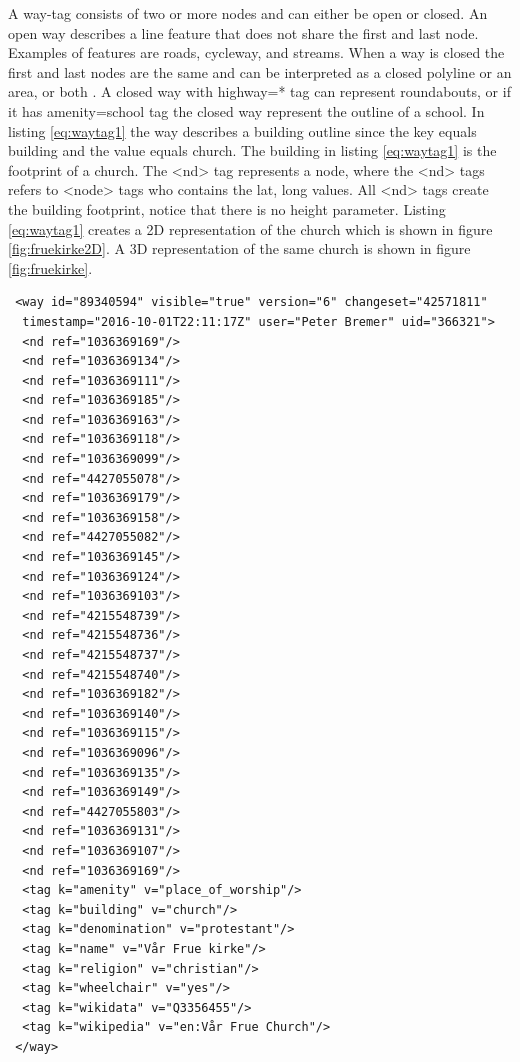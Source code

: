 A way-tag consists of two or more nodes and can either be open or closed. An open way describes a line feature that does not share the first and last node. Examples of features are roads, cycleway, and streams. When a way is closed the first and last nodes are the same and can be interpreted as a closed polyline or an area, or both \cite{OpenStreetMapd}. A closed way with highway=* tag can represent roundabouts, or if it has amenity=school tag the closed way represent the outline of a school. In listing \ref{eq:waytag1} the way describes a building outline since the key equals building and the value equals church.  The building in listing \ref{eq:waytag1} is the footprint of a church. The <nd> tag represents a node, where the <nd> tags refers to <node> tags who contains the lat, long values. All <nd> tags create the building footprint, notice that there is no height parameter. Listing \ref{eq:waytag1} creates a 2D representation of the church which is shown in figure \ref{fig:fruekirke2D}. A 3D representation of the same church is shown in figure \ref{fig:fruekirke}.

\begin{lstlisting}
 <way id="89340594" visible="true" version="6" changeset="42571811" 
  timestamp="2016-10-01T22:11:17Z" user="Peter Bremer" uid="366321">
  <nd ref="1036369169"/>
  <nd ref="1036369134"/>
  <nd ref="1036369111"/>
  <nd ref="1036369185"/>
  <nd ref="1036369163"/>
  <nd ref="1036369118"/>
  <nd ref="1036369099"/>
  <nd ref="4427055078"/>
  <nd ref="1036369179"/>
  <nd ref="1036369158"/>
  <nd ref="4427055082"/>
  <nd ref="1036369145"/>
  <nd ref="1036369124"/>
  <nd ref="1036369103"/>
  <nd ref="4215548739"/>
  <nd ref="4215548736"/>
  <nd ref="4215548737"/>
  <nd ref="4215548740"/>
  <nd ref="1036369182"/>
  <nd ref="1036369140"/>
  <nd ref="1036369115"/>
  <nd ref="1036369096"/>
  <nd ref="1036369135"/>
  <nd ref="1036369149"/>
  <nd ref="4427055803"/>
  <nd ref="1036369131"/>
  <nd ref="1036369107"/>
  <nd ref="1036369169"/>
  <tag k="amenity" v="place_of_worship"/>
  <tag k="building" v="church"/>
  <tag k="denomination" v="protestant"/>
  <tag k="name" v="Vår Frue kirke"/>
  <tag k="religion" v="christian"/>
  <tag k="wheelchair" v="yes"/>
  <tag k="wikidata" v="Q3356455"/>
  <tag k="wikipedia" v="en:Vår Frue Church"/>
 </way>
\end{lstlisting}


